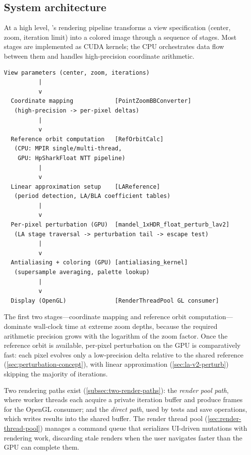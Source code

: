 \subsection*{System architecture}
\label{sec:system-architecture}

At a high level, \FractalShark{}'s rendering pipeline transforms a view
specification (center, zoom, iteration limit) into a colored image through
a sequence of stages.  Most stages are implemented as CUDA kernels; the CPU
orchestrates data flow between them and handles high-precision coordinate
arithmetic.

\begin{lstlisting}[language={},basicstyle=\ttfamily\small,columns=flexible]
  View parameters (center, zoom, iterations)
          |
          v
  Coordinate mapping            [PointZoomBBConverter]
   (high-precision -> per-pixel deltas)
          |
          v
  Reference orbit computation   [RefOrbitCalc]
   (CPU: MPIR single/multi-thread,
    GPU: HpSharkFloat NTT pipeline)
          |
          v
  Linear approximation setup    [LAReference]
   (period detection, LA/BLA coefficient tables)
          |
          v
  Per-pixel perturbation (GPU)  [mandel_1xHDR_float_perturb_lav2]
   (LA stage traversal -> perturbation tail -> escape test)
          |
          v
  Antialiasing + coloring (GPU) [antialiasing_kernel]
   (supersample averaging, palette lookup)
          |
          v
  Display (OpenGL)              [RenderThreadPool GL consumer]
\end{lstlisting}

The first two stages---coordinate mapping and reference orbit
computation---dominate wall-clock time at extreme zoom depths, because
the required arithmetic precision grows with the logarithm of the zoom
factor.  Once the reference orbit is available, per-pixel perturbation
on the GPU is comparatively fast: each pixel evolves only a low-precision
delta relative to the shared reference
(\cref{sec:perturbation-concept}), with linear approximation
(\cref{sec:la-v2-perturb}) skipping the majority of iterations.

Two rendering paths exist (\cref{subsec:two-render-paths}): the
\emph{render pool path}, where worker threads each acquire a private
iteration buffer and produce frames for the OpenGL consumer; and the
\emph{direct path}, used by tests and save operations, which writes
results into the shared  buffer.  The render thread
pool (\cref{sec:render-thread-pool}) manages a command queue that
serializes UI-driven mutations with rendering work, discarding stale
renders when the user navigates faster than the GPU can complete them.

